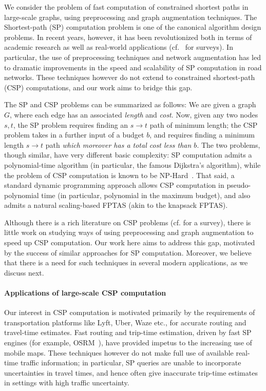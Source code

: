 

We consider the problem of fast computation of constrained shortest paths in large-scale graphs, using preprocessing and graph augmentation techniques.
The Shortest-path (SP) computation problem is one of the canonical algorithm design problems.
In recent years, however, it has been revolutionized both in terms of academic research as well as real-world applications (cf.~\cite{dimacs09,goldberg_survey} for surveys).
In particular, the use of preprocessing techniques and network augmentation has led to dramatic improvements in the speed and scalability of SP computation in road networks.
These techniques however do not extend to constrained shortest-path (CSP) computations, and our work aims to bridge this gap.


The SP and CSP problems can be summarized as follows: We are given a graph $G$, where each edge has an associated \emph{length} and \emph{cost}. 
Now, given any two nodes $s,t$, the SP problem requires finding an  $s\rightarrow t$ path of minimum length; the CSP problem takes in a further input of a budget $b$, and requires finding a minimum length $s\rightarrow t$ path \emph{which moreover has a total cost less than $b$}.
The two problems, though similar, have very different basic complexity: SP computation admits a polynomial-time algorithm (in particular, the famous Dijkstra's algorithm), while the problem of CSP computation is known to be NP-Hard~\cite{csp_survey}.
That said, a standard dynamic programming approach allows CSP computation in pseudo-polynomial time (in particular, polynomial in the maximum budget), and also admits a natural scaling-based FPTAS (akin to the knapsack FPTAS).


Although there is a rich literature on CSP problems (cf. \cite{csp_survey} for a survey), there is little work on studying ways of using preprocessing and graph augmentation to speed up CSP computation. Our work here aims to address this gap, motivated by the success of similar approaches for SP computation. Moreover, we believe that there is a need for such techniques in several modern applications, as we discuss next. 


\paragraph*{Applications of large-scale CSP computation}

Our interest in CSP computation is motivated primarily by the requirements of transportation platforms like Lyft, Uber, Waze etc., for accurate routing and travel-time estimates.
Fast routing and trip-time estimation, driven by fast SP engines (for example, OSRM~\cite{OSRM}), have provided impetus to the increasing use of mobile maps.
These techniques however do not make full use of available real-time traffic information; in particular, SP queries are unable to incorporate uncertainties in travel times, and hence often give inaccurate trip-time estimates in settings with high traffic uncertainty.


